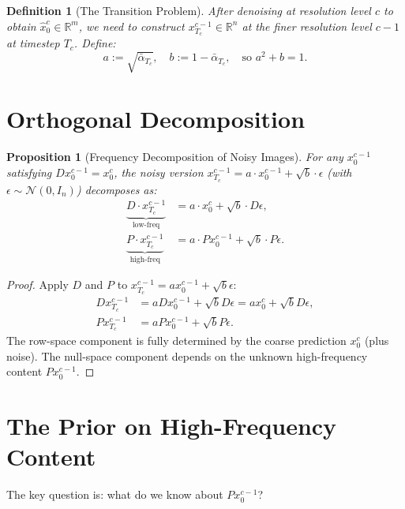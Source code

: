 \documentclass[11pt]{article}
\newtheorem{proposition}[theorem]{Proposition}
\newtheorem{definition}[theorem]{Definition}
\theoremstyle{remark}
\begin{document}
\begin{definition}[The Transition Problem]
After denoising at resolution level $c$ to obtain $\hat{x}_0^c \in \mathbb{R}^m$, we need to construct $x_{T_c}^{c-1} \in \mathbb{R}^n$ at the finer resolution level $c-1$ at timestep $T_c$. Define:
\begin{equation}
    a := \sqrt{\bar{\alpha}_{T_c}}, \quad b := 1 - \bar{\alpha}_{T_c}, \quad \text{so } a^2 + b = 1.
\end{equation}
\end{definition}

\section{Orthogonal Decomposition}

\begin{proposition}[Frequency Decomposition of Noisy Images]\label{prop:decomp}
For any $x_0^{c-1}$ satisfying $Dx_0^{c-1} = x_0^c$, the noisy version $x_{T_c}^{c-1} = a \cdot x_0^{c-1} + \sqrt{b} \cdot \epsilon$ (with $\epsilon \sim \mathcal{N}(0, I_n)$) decomposes as:
\begin{align}
    \underbrace{D \cdot x_{T_c}^{c-1}}_{\text{low-freq}} &= a \cdot x_0^c + \sqrt{b} \cdot D\epsilon, \label{eq:rowspace}\\
    \underbrace{P \cdot x_{T_c}^{c-1}}_{\text{high-freq}} &= a \cdot Px_0^{c-1} + \sqrt{b} \cdot P\epsilon. \label{eq:nullspace}
\end{align}
\end{proposition}

\begin{proof}
Apply $D$ and $P$ to $x_{T_c}^{c-1} = ax_0^{c-1} + \sqrt{b}\epsilon$:
\begin{align*}
    Dx_{T_c}^{c-1} &= aDx_0^{c-1} + \sqrt{b}D\epsilon = ax_0^c + \sqrt{b}D\epsilon, \\
    Px_{T_c}^{c-1} &= aPx_0^{c-1} + \sqrt{b}P\epsilon.
\end{align*}
The row-space component is fully determined by the coarse prediction $x_0^c$ (plus noise). The null-space component depends on the unknown high-frequency content $Px_0^{c-1}$.
\end{proof}

\section{The Prior on High-Frequency Content}

The key question is: what do we know about $Px_0^{c-1}$?
\end{document}
